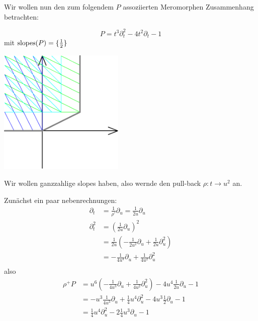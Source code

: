 Wir wollen nun den zum folgendem $P$ assoziierten Meromorphen Zusammenhang
betrachten:\\
\begin{minipage}[hbt]{0,39\textwidth}
  \[ P= t^3\partial_t^2-4t^2\partial_t-1 \]
  mit $ \operatorname{slopes}(P)=\{\frac{1}{2}\} $
\end{minipage}
\begin{minipage}[hbt]{0,59\textwidth}
  \begin{center}
    \includegraphics[width=6cm]{img/formal_b.png}
  \end{center}
\end{minipage}
Wir wollen ganzzahlige slopes haben, also wernde den pull-back
$\rho:t\rightarrow u^2$ an.

Zunächst ein paar nebenrechnungen: 
\begin{align*}
  \partial_t   &= \frac{1}{\rho'}\partial_u=\frac{1}{2u}\partial_u \\
  \partial_t^2 &= (\frac{1}{2u}\partial_u)^2\\
               &= \frac{1}{2u}(-\frac{1}{2u^2}\partial_u + 
                 \frac{1}{2u}\partial_u^2) \\
               &= -\frac{1}{4u^3}\partial_u+\frac{1}{4u^2}\partial_u^2 \\
\end{align*}
also
\begin{align*}
  \rho^+P &= u^6(-\frac{1}{4u^3}\partial_u+\frac{1}{4u^2}\partial_u^2)- 
            4u^{4}\frac{1}{2u}\partial_u-1\\
          &= -u^3\frac{1}{4u^3}\partial_u+\frac{1}{4}u^4\partial_u^2-
            4u^{3}\frac{1}{2}\partial_u-1\\
          &= \frac{1}{4}u^4\partial_u^2 -2\frac{1}{4}u^3\partial_u-1
\end{align*}


